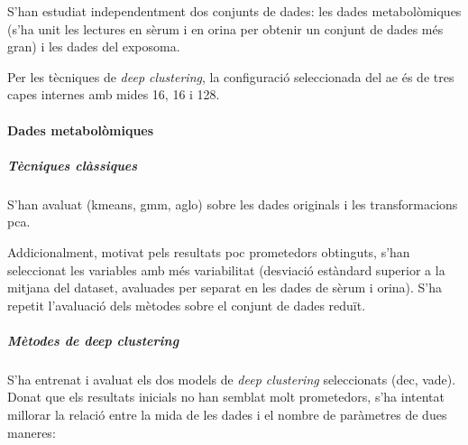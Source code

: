 \documentclass[CAT,BIB]{TFUOC}%
\begin{document}
            S'han estudiat independentment dos conjunts de dades:
            les dades metabolòmiques
            (s'ha unit les lectures en sèrum i en orina
            per obtenir un conjunt de dades més gran)
            i les dades del exposoma.

            Per les tècniques de \textit{deep clustering},
            la configuració seleccionada del \gls{ae}
            és de tres capes internes amb mides 16, 16 i 128.

            \paragraph{Dades metabolòmiques}

                \subparagraph{Tècniques clàssiques}
                    S'han avaluat (\gls{kmeans}, \gls{gmm}, \gls{aglo})
                    sobre les dades originals i les transformacions \gls{pca}.

                    Addicionalment,
                    motivat pels resultats poc prometedors obtinguts,
                    s'han seleccionat les variables amb més variabilitat
                    (desviació estàndard superior a la mitjana del dataset,
                    avaluades per separat en les dades de sèrum i orina).
                    S'ha repetit l'avaluació dels mètodes sobre el conjunt de dades reduït.

                \subparagraph{Mètodes de \textit{deep clustering}}
                    S'ha entrenat i avaluat els dos models de \textit{deep clustering} seleccionats
                    (\gls{dec}, \gls{vade}).
                    Donat que els resultats inicials no han semblat molt prometedors,
                    s'ha intentat millorar la relació entre la mida de les dades
                    i el nombre de paràmetres de dues maneres:
\end{document}

